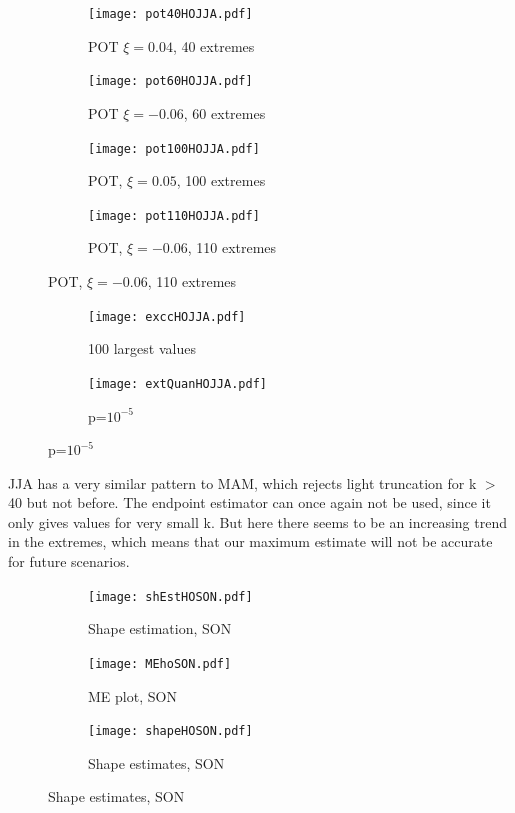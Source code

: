 \documentclass{article}
\begin{document}
	
	\begin{figure}[H]
		\centering
		\begin{subfigure}{0.5\textwidth}
			\texttt{[image: pot40HOJJA.pdf]}
			\caption{POT $\xi = 0.04$, 40 extremes}
		\end{subfigure}%
		\begin{subfigure}{0.5\textwidth}
			\texttt{[image: pot60HOJJA.pdf]}
			\caption{POT $\xi = -0.06$, 60 extremes}
		\end{subfigure}
		\begin{subfigure}{0.5\textwidth}
			\texttt{[image: pot100HOJJA.pdf]}
			\caption{POT, $\xi = 0.05$, 100 extremes }
		\end{subfigure}%
		\begin{subfigure}{0.5\textwidth}
			\texttt{[image: pot110HOJJA.pdf]}
			\caption{POT, $\xi = -0.06$, 110 extremes }
		\end{subfigure}
	\end{figure}
	
	\begin{figure}[H]
		\centering
		\begin{subfigure}{0.5\textwidth}
			\texttt{[image: exccHOJJA.pdf]}
			\caption{100 largest values}
		\end{subfigure}%
		\begin{subfigure}{0.5\textwidth}
			\texttt{[image: extQuanHOJJA.pdf]}
			\caption{p=$10^{-5}$}
		\end{subfigure}
	\end{figure}

	JJA has a very similar pattern to MAM, which rejects light truncation for k $>$ 40 but not before. The endpoint estimator can once again not be used, since it only gives values for very small k. But here there seems to be an increasing trend in the extremes, which means that our maximum estimate will not be accurate for future scenarios. 
	
	\begin{figure}[H]
		\centering
		\begin{subfigure}{0.33\textwidth}
			\texttt{[image: shEstHOSON.pdf]}
			\caption{Shape estimation, SON}
		\end{subfigure}%
		\begin{subfigure}{0.33\textwidth}
			\texttt{[image: MEhoSON.pdf]}
			\caption{ME plot, SON}
		\end{subfigure}
		\begin{subfigure}{0.33\textwidth}
			\texttt{[image: shapeHOSON.pdf]}
			\caption{Shape estimates, SON}
		\end{subfigure}
	\end{figure}
	
\end{document}
